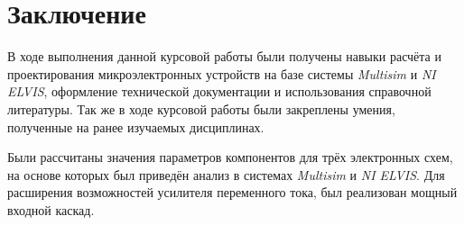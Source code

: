 \section{Заключение}

В ходе выполнения данной курсовой работы
были получены навыки расчёта и проектирования
микроэлектронных устройств на базе системы
\textit{Multisim} и \textit{NI ELVIS}, 
оформление технической документации и
использования справочной литературы.
Так же в ходе курсовой работы были
закреплены умения, полученные на ранее
изучаемых дисциплинах.

Были рассчитаны значения параметров компонентов
для трёх электронных схем, на основе которых
был приведён анализ в системах 
\textit{Multisim} и \textit{NI ELVIS}. 
Для расширения возможностей усилителя
переменного тока, был реализован мощный входной каскад.

\begin{comment}
Составлен чертёж схемы и список использования при
её построении компонентов в программе
\textit{КОМПАС-3D v17.1 Учебная версия} 
(приложение «А», приложение «B»). 
\end{comment}
